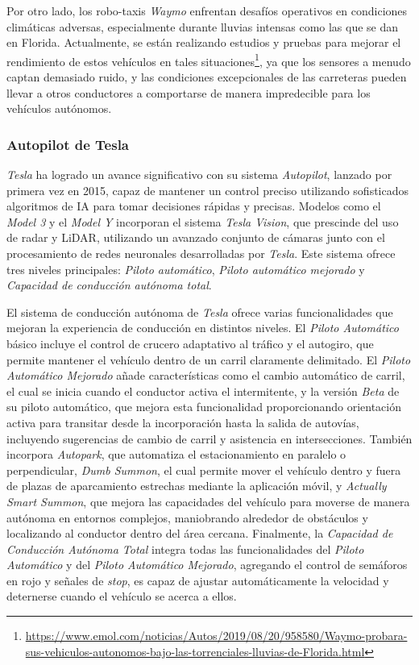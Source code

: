 Por otro lado, los robo-taxis \textit{Waymo} enfrentan desafíos operativos en condiciones climáticas adversas, especialmente durante lluvias intensas como las que se dan en Florida. Actualmente, se están realizando estudios y pruebas para mejorar el rendimiento de estos vehículos en tales situaciones\footnote{\url{https://www.emol.com/noticias/Autos/2019/08/20/958580/Waymo-probara-sus-vehiculos-autonomos-bajo-las-torrenciales-lluvias-de-Florida.html}}, ya que los sensores a menudo captan demasiado ruido, y las condiciones excepcionales de las carreteras pueden llevar a otros conductores a comportarse de manera impredecible para los vehículos autónomos.

\subsubsection{Autopilot de Tesla}

\textit{Tesla} ha logrado un avance significativo con su sistema \textit{Autopilot}, lanzado por primera vez en 2015, capaz de mantener un control preciso utilizando sofisticados algoritmos de \ac{IA} para tomar decisiones rápidas y precisas. Modelos como el \textit{Model 3} y el \textit{Model Y} incorporan el sistema \textit{Tesla Vision}, que prescinde del uso de radar y \ac{LiDAR}, utilizando un avanzado conjunto de cámaras junto con el procesamiento de redes neuronales desarrolladas por \textit{Tesla}. Este sistema ofrece tres niveles principales: \textit{Piloto automático}, \textit{Piloto automático mejorado} y \textit{Capacidad de conducción autónoma total}.

El sistema de conducción autónoma de \textit{Tesla} ofrece varias funcionalidades que mejoran la experiencia de conducción en distintos niveles. El \textit{Piloto Automático} básico incluye el control de crucero adaptativo al tráfico y el autogiro, que permite mantener el vehículo dentro de un carril claramente delimitado. El \textit{Piloto Automático Mejorado} añade características como el cambio automático de carril, el cual se inicia cuando el conductor activa el intermitente, y la versión \textit{Beta} de su piloto automático, que mejora esta funcionalidad proporcionando orientación activa para transitar desde la incorporación hasta la salida de autovías, incluyendo sugerencias de cambio de carril y asistencia en intersecciones. También incorpora \textit{Autopark}, que automatiza el estacionamiento en paralelo o perpendicular, \textit{Dumb Summon}, el cual permite mover el vehículo dentro y fuera de plazas de aparcamiento estrechas mediante la aplicación móvil, y \textit{Actually Smart Summon}, que mejora las capacidades del vehículo para moverse de manera autónoma en entornos complejos, maniobrando alrededor de obstáculos y localizando al conductor dentro del área cercana. Finalmente, la \textit{Capacidad de Conducción Autónoma Total} integra todas las funcionalidades del \textit{Piloto Automático} y del \textit{Piloto Automático Mejorado}, agregando el control de semáforos en rojo y señales de \textit{stop}, es capaz de ajustar automáticamente la velocidad y deternerse cuando el vehículo se acerca a ellos.

